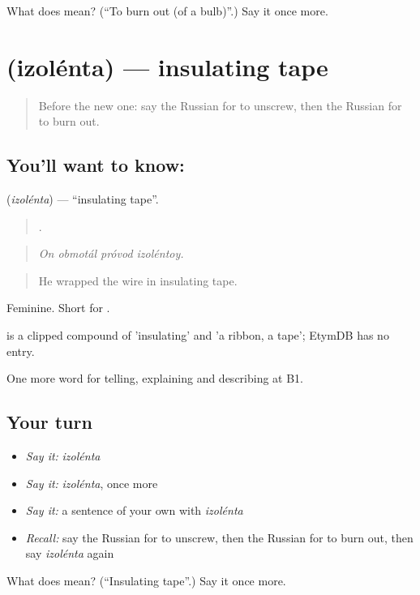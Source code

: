 \begin{tcolorbox}[breakable,colback=teal!4,colframe=teal!35!black,title={Before you move on}]
What does  mean? (\textquotedblleft{}To burn out (of a bulb)\textquotedblright{}.) Say it once more.
\end{tcolorbox}
\section[\texorpdfstring{\ru{изолента} (izolénta)}{изолента (izolénta)}]{ (izolénta) — insulating tape}

\label{lesson:RU-C533-izolenta}



\begin{quote}
Before the new one: say the Russian for to unscrew, then the Russian for to burn out.
\end{quote}

\subsection*{You'll want to know: }
\textbf{} (\emph{izolénta}) — \textquotedblleft{}insulating tape\textquotedblright{}.

\begin{quote}
   .
\end{quote}

\begin{quote}
\emph{On obmotál próvod izoléntoy.}
\end{quote}

\begin{quote}
He wrapped the wire in insulating tape.
\end{quote}

Feminine. Short for \emph{ }.

\begin{cousinweb}
\emph{} is a clipped compound of \emph{} 'insulating' and \emph{} 'a ribbon, a tape'; EtymDB has no entry.
\end{cousinweb}

\begin{grammarlens}[title={What you've built}]
One more word for telling, explaining and describing at B1.
\end{grammarlens}

\subsection*{Your turn}
\begin{itemize}
\raggedright
  \item \emph{Say it:} \emph{izolénta}
  \item \emph{Say it:} \emph{izolénta}, once more
  \item \emph{Say it:} a sentence of your own with \emph{izolénta}
  \item \emph{Recall:} say the Russian for to unscrew, then the Russian for to burn out, then say \emph{izolénta} again
\end{itemize}

\begin{tcolorbox}[breakable,colback=teal!4,colframe=teal!35!black,title={Before you move on}]
What does  mean? (\textquotedblleft{}Insulating tape\textquotedblright{}.) Say it once more.
\end{tcolorbox}

